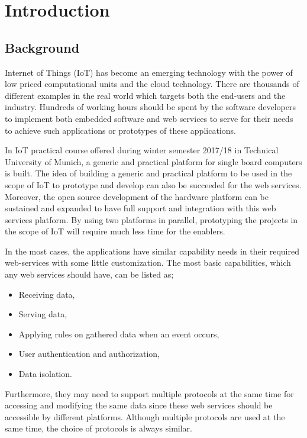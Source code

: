 
\chapter{Introduction}\label{chapter:introduction}

\section{Background}
Internet of Things (IoT) has become an emerging technology with the power of low priced computational units and the cloud technology. There are thousands of different examples in the real world which targets both the end-users and the industry. Hundreds of working hours should be spent by the software developers to implement both embedded software and web services to serve for their needs to achieve such applications or prototypes of these applications. 


In IoT practical course offered during winter semester 2017/18 in Technical University of Munich, a generic and practical platform for single board computers is built. The idea of building a generic and practical platform to be used in the scope of IoT to prototype and develop can also be succeeded for the web services. Moreover, the open source development of the hardware platform can be sustained and expanded to have full support and integration with this web services platform. By using two platforms in parallel, prototyping the projects in the scope of IoT will require much less time for the enablers.

In the most cases, the applications have similar capability needs in their required web-services with some little customization. The most basic capabilities, which any web services should have, can be listed as;
\begin{itemize}
  \item Receiving data,
  \item Serving data,
  \item Applying rules on gathered data when an event occurs,
  \item User authentication and authorization,
  \item Data isolation.
\end{itemize}
 Furthermore, they may need to support multiple protocols at the same time for accessing and modifying the same data since these web services should be accessible by different platforms. Although multiple protocols are used at the same time, the choice of protocols is always similar. 

